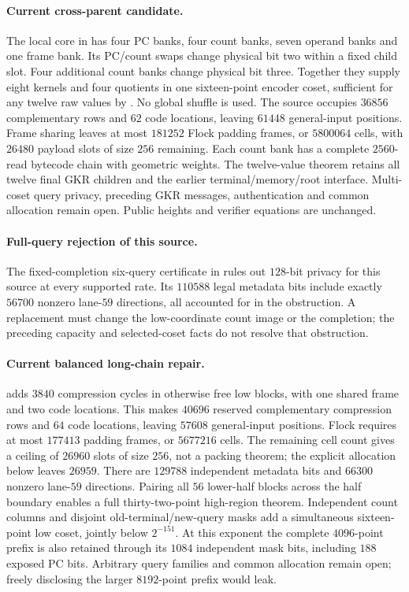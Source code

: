 \paragraph{Current cross-parent candidate.} The local core in  has four PC banks, four count banks, seven operand banks and one frame bank. Its PC/count swaps change physical bit two within a fixed child slot. Four additional count banks change physical bit three. Together they supply eight kernels and four quotients in one sixteen-point encoder coset, sufficient for any twelve raw values by . No global shuffle is used. The source occupies $36856$ complementary rows and $62$ code locations, leaving $61448$ general-input positions. Frame sharing leaves at most $181252$ Flock padding frames, or $5800064$ cells, with $26480$ payload slots of size $256$ remaining. Each count bank has a complete $2560$-read bytecode chain with geometric weights. The twelve-value theorem retains all twelve final GKR children and the earlier terminal/memory/root interface. Multi-coset query privacy, preceding GKR messages, authentication and common allocation remain open. Public heights and verifier equations are unchanged.

\paragraph{Full-query rejection of this source.} The fixed-completion six-query certificate in  rules out $128$-bit privacy for this source at every supported rate. Its $110588$ legal metadata bits include exactly $56700$ nonzero lane-$59$ directions, all accounted for in the obstruction. A replacement must change the low-coordinate count image or the completion; the preceding capacity and selected-coset facts do not resolve that obstruction.

\paragraph{Current balanced long-chain repair.}  adds $3840$ compression cycles in otherwise free low blocks, with one shared frame and two code locations. This makes $40696$ reserved complementary compression rows and $64$ code locations, leaving $57608$ general-input positions. Flock requires at most $177413$ padding frames, or $5677216$ cells. The remaining cell count gives a ceiling of $26960$ slots of size $256$, not a packing theorem; the explicit allocation below leaves $26959$. There are $129788$ independent metadata bits and $66300$ nonzero lane-$59$ directions. Pairing all $56$ lower-half blocks across the half boundary enables a full thirty-two-point high-region theorem. Independent count columns and disjoint old-terminal/new-query masks add a simultaneous sixteen-point low coset, jointly below $2^{-151}$. At this exponent the complete $4096$-point prefix is also retained through its $1084$ independent mask bits, including $188$ exposed PC bits. Arbitrary query families and common allocation remain open; freely disclosing the larger $8192$-point prefix would leak.

